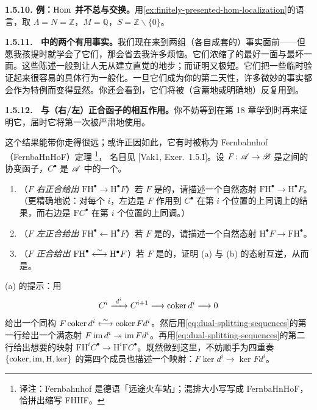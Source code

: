 \textbf{1.5.10. 例：$\operatorname{Hom}$ 并不总与\trLocalization{}交换。}\quad 用\cref{ex:finitely-presented-hom-localization}的语言，取 $\Lambda=N=\mathbb{Z}$，$M=\mathbb{Q}$，$S=\mathbb{Z}\smallsetminus\{0\}$。

\textbf{1.5.11. \hard\ \trHomologicalAlgebra{}中的两个有用事实。}\quad 我们现在来到两组（各自成套的）事实面前——但愿我孩提时就学会了它们，那会省去我许多烦恼。它们浓缩了\trAbstractNonsense{}的最好一面与最坏一面。这些陈述一般到让人无从建立直觉的地步；而证明又极短。它们把一些临时验证起来很容易的具体行为一般化。一旦它们成为你的第二天性，许多微妙的事实都会作为特例而变得显然。你还会看到，它们将被（含蓄地或明确地）反复用到。

\textbf{1.5.12. \hard\ \trHomology{}与（右/左）正合函子的相互作用。}\quad 你不妨等到在第 18 章学到\trCohomology{}时再来证明它，届时它将第一次被严肃地使用。

\begin{exercise}\label{ex:fhhf-theorem-functor-cohomology}
这个结果能带你走得很远；或许正因如此，它有时被称为 Fernbahnhof（FernbaHnHoF）定理%
\footnote{译注：Fernbahnhof 是德语「远途火车站」；混排大小写写成 FernbaHnHoF，恰拼出缩写 FHHF。}，
名目见 [Vak1, Exer.~1.5.I]。设 $F\colon\mathscr{A}\to\mathscr{B}$ 是\trAbelianCategory{}之间的协变函子，$C^{\bullet}$ 是 $\mathscr{A}$ 中的一个\trComplexN。
\begin{enumerate}[label=(\alph*)]
\item （$F$ \emph{右正合给出} $\mathrm{FH}^{\bullet}\to\mathrm{H}^{\bullet}F$）若 $F$ 是\trRightExact{}的，请描述一个自然态射 $\mathrm{FH}^{\bullet}\to\mathrm{H}^{\bullet}F$。（更精确地说：对每个 $i$，左边是 $F$ 作用到 $C^{\bullet}$ 在第 $i$ 个位置的上同调上的结果，而右边是 $\mathrm{F}C^{\bullet}$ 在第 $i$ 个位置的上同调。）
\item （$F$ \emph{左正合给出} $\mathrm{FH}^{\bullet}\leftarrow\mathrm{H}^{\bullet}F$）若 $F$ 是\trLeftExact{}的，请描述一个自然态射 $\mathrm{H}^{\bullet}F\to\mathrm{FH}^{\bullet}$。
\item （$F$ \emph{正合给出} $\mathrm{FH}^{\bullet}\mathrel{\overset{\sim}{\leftarrow\joinrel\rightarrow}}\mathrm{H}^{\bullet}F$）若 $F$ 是\trExact{}的，证明 (a) 与 (b) 的态射互逆，从而是\trIsomorphism。
\end{enumerate}
(a) 的提示：用
\[
C^{i}\mathrel{\xrightarrow{\ d^{i}\ }}C^{i+1}\longrightarrow\coker d^{i}\longrightarrow 0
\]
给出一个同构 $F\coker d^{i}\mathrel{\overset{\sim}{\leftarrow\joinrel\rightarrow}}\coker Fd^{i}$。然后用\eqref{eq:dual-splitting-sequences}的第一行给出一个满态射 $F\operatorname{im} d^{i}\twoheadrightarrow\operatorname{im} Fd^{i}$。再用\eqref{eq:dual-splitting-sequences}的第二行给出想要的映射 $\mathrm{FH}^{i}C^{\bullet}\to\mathrm{H}^{i}\mathrm{F}C^{\bullet}$。既然做到这里，不妨顺手为四重奏 $\{\operatorname{coker},\operatorname{im},\mathrm{H},\ker\}$ 的第四个成员也描述一个映射：$F\ker d^{i}\to\ker Fd^{i}$。
\end{exercise}

